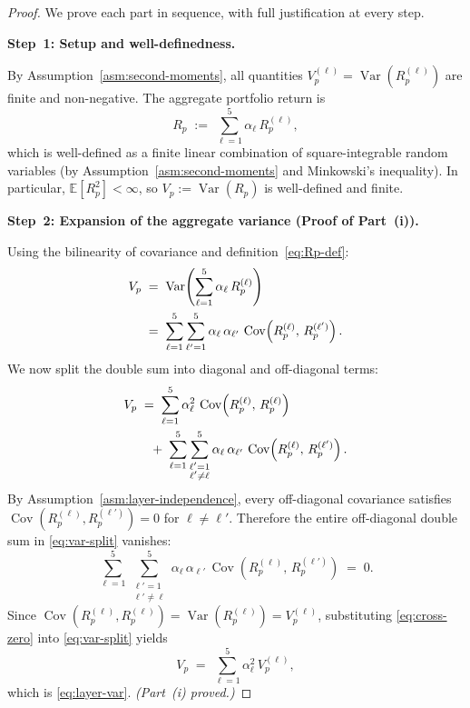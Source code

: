 \documentclass[12pt,openany]{book}
\DeclareMathOperator{\Var}{Var}
\DeclareMathOperator{\Cov}{Cov}
\numberwithin{equation}{chapter}
\theoremstyle{plain}
\theoremstyle{definition}
\theoremstyle{remark}
\begin{document}
\begin{proof}
We prove each part in sequence, with full justification at every
step.

\medskip
\noindent\textbf{Step~1: Setup and well-definedness.}

By Assumption~\ref{asm:second-moments}, all quantities
$V_p^{(\ell)} = \Var(R_p^{(\ell)})$ are finite and non-negative.
The aggregate portfolio return is
\begin{equation}
  R_p
  \;:=\;
  \sum_{\ell=1}^{5} \alpha_\ell\, R_p^{(\ell)},
  \label{eq:Rp-def}
\end{equation}
which is well-defined as a finite linear combination of
square-integrable random variables (by
Assumption~\ref{asm:second-moments} and
Minkowski's inequality).  In particular,
$\mathbb{E}[R_p^2] < \infty$, so $V_p := \Var(R_p)$ is
well-defined and finite.

\medskip
\noindent\textbf{Step~2: Expansion of the aggregate variance
(Proof of Part~(i)).}

Using the bilinearity of covariance and
definition~\eqref{eq:Rp-def}:
\begin{align}
  V_p
  &\;=\; \Var\!\left(\sum_{\ell=1}^{5}
           \alpha_\ell\, R_p^{(\ell)}\right)
  \notag \\
  &\;=\; \sum_{\ell=1}^{5}\sum_{\ell'=1}^{5}
         \alpha_\ell\,\alpha_{\ell'}\,
         \Cov\!\left(R_p^{(\ell)},\, R_p^{(\ell')}\right).
  \label{eq:var-expand}
\end{align}
We now split the double sum into diagonal and off-diagonal terms:
\begin{align}
  V_p
  &\;=\; \sum_{\ell=1}^{5}
         \alpha_\ell^2\,
         \Cov\!\left(R_p^{(\ell)},\, R_p^{(\ell)}\right)
  \notag \\
  &\quad +\;
         \sum_{\ell=1}^{5}\sum_{\substack{\ell'=1\\\ell'\neq\ell}}^{5}
         \alpha_\ell\,\alpha_{\ell'}\,
         \Cov\!\left(R_p^{(\ell)},\, R_p^{(\ell')}\right).
  \label{eq:var-split}
\end{align}
By Assumption~\ref{asm:layer-independence}, every off-diagonal
covariance satisfies
$\Cov(R_p^{(\ell)}, R_p^{(\ell')}) = 0$ for $\ell \neq \ell'$.
Therefore the entire off-diagonal double sum in
\eqref{eq:var-split} vanishes:
\begin{equation}
  \sum_{\ell=1}^{5}\sum_{\substack{\ell'=1\\\ell'\neq\ell}}^{5}
  \alpha_\ell\,\alpha_{\ell'}\,
  \Cov\!\left(R_p^{(\ell)},\, R_p^{(\ell')}\right)
  \;=\; 0.
  \label{eq:cross-zero}
\end{equation}
Since $\Cov(R_p^{(\ell)}, R_p^{(\ell)}) = \Var(R_p^{(\ell)})
= V_p^{(\ell)}$, substituting \eqref{eq:cross-zero} into
\eqref{eq:var-split} yields
\begin{equation}
  V_p
  \;=\; \sum_{\ell=1}^{5} \alpha_\ell^2\, V_p^{(\ell)},
  \label{eq:layer-var-proved}
\end{equation}
which is \eqref{eq:layer-var}. \hfill\textit{(Part~(i) proved.)}


\end{proof}
\end{document}
